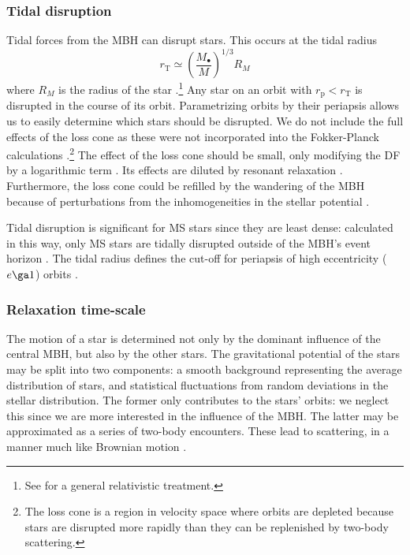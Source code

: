 \documentclass[useAMS,usedcolumn,usegraphicx,usenatbib]{mn2e}
\newcommand{\sub}[1]{\ensuremath{_\mathrm{#1}}}
\begin{document}
\subsubsection{Tidal disruption}

Tidal forces from the MBH can disrupt stars. This occurs at the tidal radius
\begin{equation}
r\sub{T} \simeq \left(\frac{M_\bullet}{M}\right)^{1/3}R_M
\label{eq:Tidal}
\end{equation}
where $R_M$ is the radius of the star \citep{Hills1975, Rees1988, Kobayashi2004}.\footnote{See \citet{Kesden2012} for a general relativistic treatment.} Any star on an orbit with $r\sub{p} < r\sub{T}$ is disrupted in the course of its orbit. Parametrizing orbits by their periapsis allows us to easily determine which stars should be disrupted. We do not include the full effects of the loss cone \citep{Frank1976, Lightman1977, Cohn1978} as these were not incorporated into the Fokker-Planck calculations \citep{Hopman2009}.\footnote{The loss cone is a region in velocity space where orbits are depleted because stars are disrupted more rapidly than they can be replenished by two-body scattering.} The effect of the loss cone should be small, only modifying the DF by a logarithmic term \citep{Lightman1977, Bahcall1977, Cohn1978}. Its effects are diluted by resonant relaxation \citep{Hopman2007,Toonen2009,Merritt2011}. Furthermore, the loss cone could be refilled by the wandering of the MBH because of perturbations from the inhomogeneities in the stellar potential \citep{Sigurdsson1997,Chatterjee2002,Merritt2007}.

Tidal disruption is significant for MS stars since they are least dense: calculated in this way, only MS stars are tidally disrupted outside of the MBH's event horizon \citep{Sigurdsson1997}. The tidal radius defines the cut-off for periapsis of high eccentricity ($e \ga 1$) orbits \citep{Lightman1977}.

\subsubsection{Relaxation time-scale}\label{sec:Relax}

The motion of a star is determined not only by the dominant influence of the central MBH, but also by the other stars. The gravitational potential of the stars may be split into two components: a smooth background representing the average distribution of stars, and statistical fluctuations from random deviations in the stellar distribution. The former only contributes to the stars' orbits: we neglect this since we are more interested in the influence of the MBH. The latter may be approximated as a series of two-body encounters. These lead to scattering, in a manner much like Brownian motion \citep{Bekenstein1992,Maoz1993,Nelson1999}.
\end{document}
